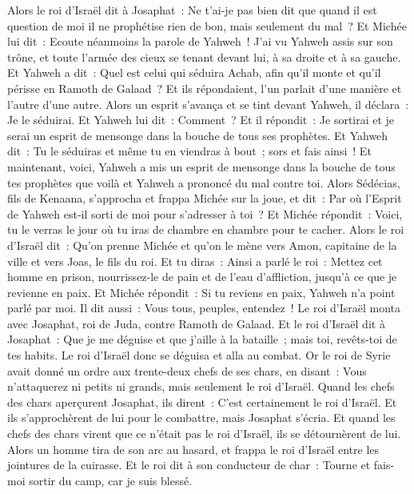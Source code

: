 \begin{multicols}{2}
Alors le roi d'Israël dit à Josaphat~: Ne t'ai-je pas bien dit que quand il est question de moi il ne prophétise rien de bon, mais seulement du mal~?
Et Michée lui dit~: Ecoute néanmoins la parole de Yahweh~! J'ai vu Yahweh assis sur son trône, et toute l'armée des cieux se tenant devant lui, à sa droite et à sa gauche.
Et Yahweh a dit~: Quel est celui qui séduira Achab, afin qu'il monte et qu'il périsse en Ramoth de Galaad~? Et ils répondaient, l'un parlait d'une manière et l'autre d'une autre.
Alors un esprit s'avança et se tint devant Yahweh, il déclara~: Je le séduirai. Et Yahweh lui dit~: Comment~?
Et il répondit~: Je sortirai et je serai un esprit de mensonge dans la bouche de tous ses prophètes. Et Yahweh dit~: Tu le séduiras et même tu en viendras à bout~; sors et fais ainsi~!
Et maintenant, voici, Yahweh a mis un esprit de mensonge dans la bouche de tous tes prophètes que voilà et Yahweh a prononcé du mal contre toi.
Alors Sédécias, fils de Kenaana, s'approcha et frappa Michée sur la joue, et dit~: Par où l'Esprit de Yahweh est-il sorti de moi pour s'adresser à toi~?
Et Michée répondit~: Voici, tu le verras le jour où tu iras de chambre en chambre pour te cacher.
Alors le roi d'Israël dit~: Qu'on prenne Michée et qu'on le mène vers Amon, capitaine de la ville et vers Joas, le fils du roi.
Et tu diras~: Ainsi a parlé le roi~: Mettez cet homme en prison, nourrissez-le de pain et de l'eau d'affliction, jusqu'à ce que je revienne en paix.
Et Michée répondit~: Si tu reviens en paix, Yahweh n'a point parlé par moi. Il dit aussi~: Vous tous, peuples, entendez~!
Le roi d'Israël monta avec Josaphat, roi de Juda, contre Ramoth de Galaad.
Et le roi d'Israël dit à Josaphat~: Que je me déguise et que j'aille à la bataille~; mais toi, revêts-toi de tes habits. Le roi d'Israël donc se déguisa et alla au combat.
Or le roi de Syrie avait donné un ordre aux trente-deux chefs de ses chars, en disant~: Vous n'attaquerez ni petits ni grands, mais seulement le roi d'Israël.
Quand les chefs des chars aperçurent Josaphat, ils dirent~: C'est certainement le roi d'Israël. Et ils s'approchèrent de lui pour le combattre, mais Josaphat s'écria.
Et quand les chefs des chars virent que ce n'était pas le roi d'Israël, ils se détournèrent de lui.
Alors un homme tira de son arc au hasard, et frappa le roi d'Israël entre les jointures de la cuirasse. Et le roi dit à son conducteur de char~: Tourne et fais-moi sortir du camp, car je suis blessé.

\end{multicols}

